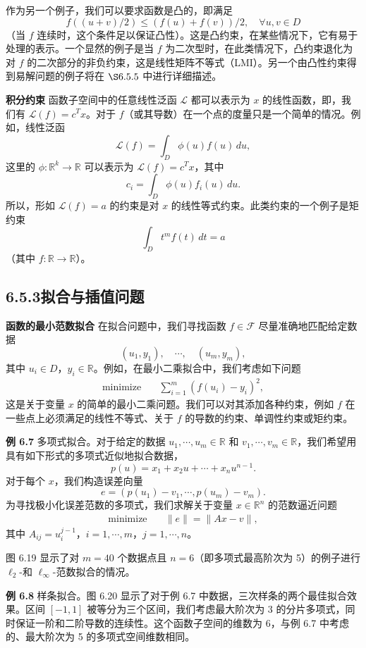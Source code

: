 \documentclass[UTF8,12pt,a4paper,fontset=fandol]{ctexart}
\begin{document}
作为另一个例子，我们可以要求函数是凸的，即满足
\[
f((u+v)/2)\leq (f(u)+f(v))/2,\quad \forall u,v\in D
\]
（当 $f$ 连续时，这个条件足以保证凸性）。这是凸约束，在某些情况下，它有易于处理的表示。一个显然的例子是当 $f$ 为二次型时，在此类情况下，凸约束退化为对 $f$ 的二次部分的非负约束，这是线性矩阵不等式（LMI）。另一个由凸性约束得到易解问题的例子将在 $\S 6.5.5$ 中进行详细描述。

\noindent\textbf{积分约束}\quad
函数子空间中的任意线性泛函 $\mathcal{L}$ 都可以表示为 $x$ 的线性函数，即，我们有 $\mathcal{L}(f)=c^Tx$。对于 $f$（或其导数）在一个点的度量只是一个简单的情况。例如，线性泛函
\[
\mathcal{L}(f)=\int_D \phi(u)f(u)\,du,
\]
这里的 $\phi:\mathbb{R}^k\to\mathbb{R}$ 可以表示为 $\mathcal{L}(f)=c^Tx$，其中
\[
c_i=\int_D \phi(u)f_i(u)\,du.
\]
所以，形如 $\mathcal{L}(f)=a$ 的约束是对 $x$ 的线性等式约束。此类约束的一个例子是矩约束
\[
\int_D t^m f(t)\,dt=a
\]
（其中 $f:\mathbb{R}\to\mathbb{R}$）。

\subsection*{6.5.3\quad 拟合与插值问题}

\noindent\textbf{函数的最小范数拟合}\quad
在拟合问题中，我们寻找函数 $f\in\mathcal{F}$ 尽量准确地匹配给定数据
\[
(u_1,y_1),\quad \cdots,\quad (u_m,y_m),
\]
其中 $u_i\in D$，$y_i\in\mathbb{R}$。例如，在最小二乘拟合中，我们考虑如下问题
\[
\begin{aligned}
\text{minimize}\quad & \sum_{i=1}^m(f(u_i)-y_i)^2,
\end{aligned}
\]
这是关于变量 $x$ 的简单的最小二乘问题。我们可以对其添加各种约束，例如 $f$ 在一些点上必须满足的线性不等式、关于 $f$ 的导数的约束、单调性约束或矩约束。

\noindent\textbf{例 6.7}\quad
多项式拟合。对于给定的数据 $u_1,\cdots,u_m\in\mathbb{R}$ 和 $v_1,\cdots,v_m\in\mathbb{R}$，我们希望用具有如下形式的多项式近似地拟合数据，
\[
p(u)=x_1+x_2u+\cdots+x_nu^{n-1}.
\]
对于每个 $x$，我们构造误差向量
\[
e=(p(u_1)-v_1,\cdots,p(u_m)-v_m).
\]
为寻找极小化误差范数的多项式，我们求解关于变量 $x\in\mathbb{R}^n$ 的范数逼近问题
\[
\begin{aligned}
\text{minimize}\quad & \|e\|=\|Ax-v\|,
\end{aligned}
\]
其中 $A_{ij}=u_i^{j-1}$，$i=1,\cdots,m$，$j=1,\cdots,n$。

图 6.19 显示了对 $m=40$ 个数据点且 $n=6$（即多项式最高阶次为 5）的例子进行 $\ell_2$-和 $\ell_\infty$-范数拟合的情况。

\noindent\textbf{例 6.8}\quad
样条拟合。图 6.20 显示了对于例 6.7 中数据，三次样条的两个最佳拟合效果。区间 $[-1,1]$ 被等分为三个区间，我们考虑最大阶次为 3 的分片多项式，同时保证一阶和二阶导数的连续性。这个函数子空间的维数为 6，与例 6.7 中考虑的、最大阶次为 5 的多项式空间维数相同。
\end{document}
